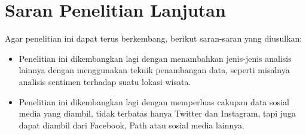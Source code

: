 \section{Saran Penelitian Lanjutan}
Agar penelitian ini dapat terus berkembang, berikut saran-saran yang diusulkan:
\begin{itemize}
	\item Penelitian ini dikembangkan lagi dengan menambahkan jenis-jenis analisis lainnya dengan menggunakan teknik penambangan data, seperti misalnya analisis sentimen terhadap suatu lokasi wisata.
	\item Penelitian ini dikembangkan lagi dengan memperluas cakupan data sosial media yang diambil, tidak terbatas hanya Twitter dan Instagram, tapi juga dapat diambil dari Facebook, Path atau sosial media lainnya.
\end{itemize}